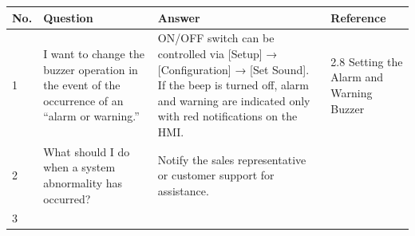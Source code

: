\begin{longtable}[]{@{}llll@{}}
\toprule
\begin{minipage}[b]{0.08\columnwidth}\raggedright
No.\strut
\end{minipage} & \begin{minipage}[b]{0.30\columnwidth}\raggedright
Question\strut
\end{minipage} & \begin{minipage}[b]{0.33\columnwidth}\raggedright
Answer\strut
\end{minipage} & \begin{minipage}[b]{0.17\columnwidth}\raggedright
Reference\strut
\end{minipage}\tabularnewline
\midrule
\endhead
\begin{minipage}[t]{0.08\columnwidth}\raggedright
1\strut
\end{minipage} & \begin{minipage}[t]{0.30\columnwidth}\raggedright
I want to change the buzzer operation in the event of the occurrence of
an ``alarm or warning.''\strut
\end{minipage} & \begin{minipage}[t]{0.33\columnwidth}\raggedright
ON/OFF switch can be controlled via {[}Setup{]} → {[}Configuration{]} →
{[}Set Sound{]}. If the beep is turned off, alarm and warning are
indicated only with red notifications on the HMI.\strut
\end{minipage} & \begin{minipage}[t]{0.17\columnwidth}\raggedright
2.8 Setting the Alarm and Warning Buzzer\strut
\end{minipage}\tabularnewline
\begin{minipage}[t]{0.08\columnwidth}\raggedright
2\strut
\end{minipage} & \begin{minipage}[t]{0.30\columnwidth}\raggedright
What should I do when a system abnormality has occurred?\strut
\end{minipage} & \begin{minipage}[t]{0.33\columnwidth}\raggedright
Notify the sales representative or customer support for
assistance.\strut
\end{minipage} & \begin{minipage}[t]{0.17\columnwidth}\raggedright
\strut
\end{minipage}\tabularnewline
\begin{minipage}[t]{0.08\columnwidth}\raggedright
3\strut
\end{minipage} & \begin{minipage}[t]{0.30\columnwidth}\raggedright

\end{minipage}
\end{longtable}

